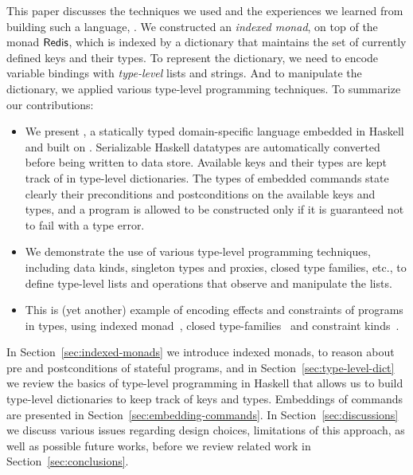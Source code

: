This paper discusses the techniques we used and the experiences we learned from
building such a language, \Edis{}. We constructed an {\em indexed monad}, on
top of the monad \ensuremath{\Conid{Redis}}, which is indexed by a dictionary that maintains the
set of currently defined keys and their types. To represent the dictionary, we
need to encode variable bindings with {\em type-level} lists and strings. And
to manipulate the dictionary, we applied various type-level programming
techniques. To summarize our contributions:
\begin{itemize}
\item We present \Edis{}, a statically typed domain-specific language embedded in Haskell and built on \Hedis{}. Serializable Haskell datatypes are
automatically converted before being written to \Redis{} data store. Available
keys and their types are kept track of in type-level dictionaries. The types of
embedded commands state clearly their preconditions and postconditions on the
available keys and types, and a program is allowed to be constructed only if
it is guaranteed not to fail with a type error.
%
\item We demonstrate the use of various type-level programming techniques,
including data kinds, singleton types and proxies, closed type families, etc.,
to define type-level lists and operations that observe and manipulate the lists.
%
\item This is (yet another) example of encoding effects and constraints of programs in types, using indexed monad~\cite{indexedmonad}, closed
type-families~\cite{tfclosed} and constraint kinds~\cite{constraintskinds}.
\end{itemize}

In Section~\ref{sec:indexed-monads} we introduce indexed monads, to reason about
pre and postconditions of stateful programs, and in Section~\ref{sec:type-level-dict} we review the basics of type-level
programming in Haskell that allows us to build type-level dictionaries to keep
track of keys and types. Embeddings of \Redis{} commands are presented in
Section~\ref{sec:embedding-commands}. In Section~\ref{sec:discussions} we
discuss various issues regarding design choices, limitations of this approach,
as well as possible future works, before we review related work in
Section~\ref{sec:conclusions}.

